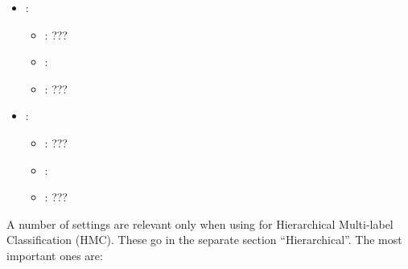 \begin{itemize}
    \item {}:
           \begin{itemize}
                \item \optionPossibleValues{}: ???
                \item \optionDefaultValue{}: 
                \item \optionDescrption{}: ???
           \end{itemize}
    \item {}:
           \begin{itemize}
                \item \optionPossibleValues{}: ???
                \item \optionDefaultValue{}: 
                \item \optionDescrption{}: ???
           \end{itemize}
\end{itemize}



A number of settings are relevant only when using \clus{} for Hierarchical Multi-label Classification (HMC).  These go in the separate section ``Hierarchical''.  The most important ones are:

